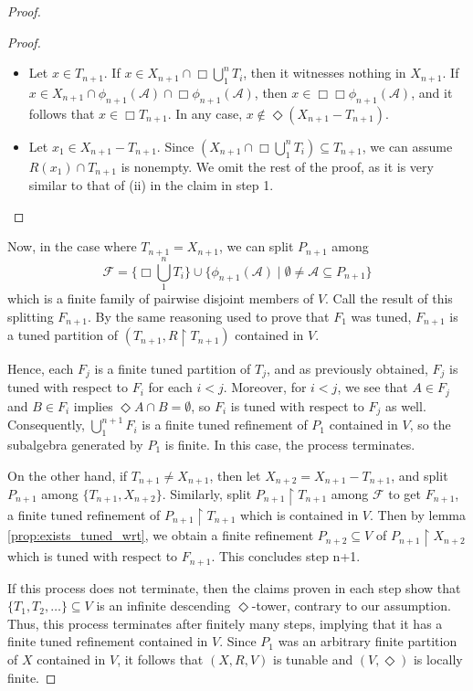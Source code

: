 \documentclass[10pt,a4paper]{amsart}
\begin{document}
\begin{proof}
    \begin{proof}
    \begin{itemize}
    \item[(i)] Let $x \in T_{n+1}$.
        If $x\in X_{n+1}\cap\Box\bigcup_1^n T_i$, then it witnesses nothing in $X_{n+1}$.
        If $x\in X_{n+1} \cap \phi_{n+1}(\mathcal{A}) \cap \Box\phi_{n+1}(\mathcal{A})$, then $x \in \Box\Box\phi_{n+1}(\mathcal{A})$, and it follows that $x \in \Box T_{n+1}$. In any case, $x \notin \Diamond(X_{n+1} - T_{n+1})$.
    \item[(ii)] Let $x_1 \in X_{n+1}-T_{n+1}$. 
    Since $(X_{n+1}\cap\Box\bigcup_1^nT_i) \subseteq T_{n+1}$, we can assume $R(x_1) \cap T_{n+1}$ is nonempty. 
    We omit the rest of the proof, as it is very similar to that of (ii) in the claim in step 1.
    \end{itemize}
    \end{proof}
    \par
    Now, in the case where $T_{n+1}=X_{n+1}$, we can split $P_{n+1}$ among 
    \[
    \mathcal{F}=\{\Box\bigcup_1^nT_i\}\cup \{\phi_{n+1}(\mathcal{A}) \mid \emptyset \neq \mathcal{A} \subseteq P_{n+1}\}
    \]
    which is a finite family of pairwise disjoint members of $V$. Call the result of this splitting $F_{n+1}$. 
    By the same reasoning used to prove that $F_1$ was tuned, $F_{n+1}$ is a tuned partition of $(T_{n+1},R\restriction T_{n+1})$ contained in $V$.
    \par
    Hence, each $F_j$ is a finite tuned partition of $T_j$, and as previously obtained, $F_j$ is tuned with respect to $F_i$ for each $i<j$.
    Moreover, for $i<j$, we see that $A \in F_j$ and $B \in F_i$ implies $\Diamond A \cap B = \emptyset$, so $F_i$ is tuned with respect to $F_j$ as well.
    Consequently, $\bigcup_1^{n+1}F_i$ is a finite tuned refinement of $P_1$ contained in $V$, so the subalgebra generated by $P_1$ is finite. In this case, the process terminates.
    \par
    On the other hand, if $T_{n+1}\neq X_{n+1}$, then let $X_{n+2}=X_{n+1}-T_{n+1}$, and split $P_{n+1}$ among $\{T_{n+1},X_{n+2}\}$.
    Similarly, split $P_{n+1} \restriction T_{n+1}$ among $\mathcal{F}$ to get $F_{n+1}$, a finite tuned refinement of $P_{n+1} \restriction T_{n+1}$ which is contained in $V$.
    Then by lemma \ref{prop:exists_tuned_wrt}, we obtain a finite refinement $P_{n+2}\subseteq V$ of $P_{n+1}\restriction X_{n+2}$ which is tuned with respect to $F_{n+1}$. 
    This concludes step n+1.
    \par
    If this process does not terminate, then the claims proven in each step show that $\{T_1,T_2,\dots\}\subseteq V$ is an infinite descending $\Diamond$-tower, contrary to our assumption. Thus, this process terminates after finitely many steps, implying that it has a finite tuned refinement contained in $V$.
    Since $P_1$ was an arbitrary finite partition of $X$ contained in $V$, it follows that $(X,R,V)$ is tunable and $(V,\Diamond)$ is locally finite.    
\end{proof}
\end{document}
